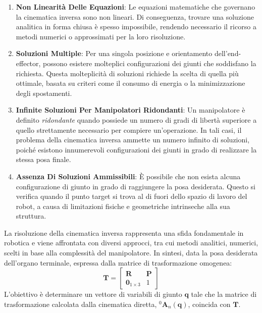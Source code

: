 ﻿\documentclass[11pt, a4paper]{article}
\begin{document}
\begin{enumerate}
    \item \textbf{Non Linearità Delle Equazioni}: Le equazioni matematiche che governano la cinematica inversa sono non lineari. Di conseguenza, trovare una soluzione analitica in forma chiusa è spesso impossibile, rendendo necessario il ricorso a metodi numerici o approssimati per la loro risoluzione.

    \item \textbf{Soluzioni Multiple}: Per una singola posizione e orientamento dell'end-effector, possono esistere molteplici configurazioni dei giunti che soddisfano la richiesta. Questa molteplicità di soluzioni richiede la scelta di quella più ottimale, basata su criteri come il consumo di energia o la minimizzazione degli spostamenti.

    \item \textbf{Infinite Soluzioni Per Manipolatori Ridondanti}: Un manipolatore è definito \textit{ridondante} quando possiede un numero di gradi di libertà superiore a quello strettamente necessario per compiere un'operazione. In tali casi, il problema della cinematica inversa ammette un numero infinito di soluzioni, poiché esistono innumerevoli configurazioni dei giunti in grado di realizzare la stessa posa finale.

    \item \textbf{Assenza Di Soluzioni Ammissibili}: È possibile che non esista alcuna configurazione di giunto in grado di raggiungere la posa desiderata. Questo si verifica quando il punto target si trova al di fuori dello spazio di lavoro del robot, a causa di limitazioni fisiche e geometriche intrinseche alla sua struttura.
\end{enumerate}

La risoluzione della cinematica inversa rappresenta una sfida fondamentale in robotica e viene affrontata con diversi approcci, tra cui metodi analitici, numerici, scelti in base alla complessità del manipolatore. In sintesi, data la posa desiderata dell'organo terminale, espressa dalla matrice di trasformazione omogenea:
\[
    \bm{T} =
    \begin{bmatrix}
        \bm{R} & \bm{P}\\
        \bm{0}_{1\times 3} & 1
    \end{bmatrix}
\]
L'obiettivo è determinare un vettore di variabili di giunto \( \mathbf{q} \) tale che la matrice di trasformazione calcolata dalla cinematica diretta, \(^{0}\bm{A}_{n}(\mathbf{q})\), coincida con \(\bm{T}\).
\end{document}
